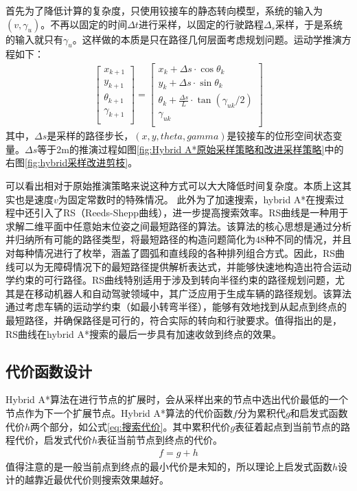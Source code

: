 \documentclass[master,academic]{ysuthesis} %
\begin{document}
		首先为了降低计算的复杂度，只使用铰接车的静态转向模型，系统的输入为$(v,\gamma_u)$。不再以固定的时间$\Delta t$进行采样，以固定的行驶路程$\Delta_s$采样，于是系统的输入就只有$\gamma_u$。这样做的本质是只在路径几何层面考虑规划问题。运动学推演方程如下：
		\begin{equation}
			\begin{aligned}
				\left[ \begin{array}{c}
					x_{k+1}\\
					y_{k+1}\\
					\theta _{k+1}\\
					\gamma _{k+1}\\
				\end{array} \right] =\left[ \begin{array}{c}
					x_k+\Delta s\cdot \cos\theta _k\\
					y_k+\Delta s\cdot \sin\theta _k\\
					\theta _k+\frac{\Delta s}{L}\cdot \tan (\gamma _{uk}/2 )\\
					\gamma _{uk}\\
				\end{array} \right] 
			\end{aligned}
			\label{eq:改进运动学推演策略}
		\end{equation}
		其中，$\Delta s$是采样的路径步长，$(x,y,theta,gamma)$是铰接车的位形空间状态变量。$\Delta s$等于2m的推演过程如图\ref{fig:Hybrid A*原始采样策略和改进采样策略}中的右图\ref{fig:hybrid采样改进剪枝}。

		可以看出相对于原始推演策略来说这种方式可以大大降低时间复杂度。本质上这其实也是速度$v$为固定常数时的特殊情况。
		此外为了加速搜索，hybrid A*在搜索过程中还引入了RS（Reeds-Shepp曲线），进一步提高搜索效率。RS曲线是一种用于求解二维平面中任意始末位姿之间最短路径的算法。该算法的核心思想是通过分析并归纳所有可能的路径类型，将最短路径的构造问题简化为48种不同的情况，并且对每种情况进行了枚举，涵盖了圆弧和直线段的各种排列组合方式。因此，RS曲线可以为无障碍情况下的最短路径提供解析表达式，并能够快速地构造出符合运动学约束的可行路径。RS曲线特别适用于涉及到转向半径约束的路径规划问题，尤其是在移动机器人和自动驾驶领域中，其广泛应用于生成车辆的路径规划。该算法通过考虑车辆的运动学约束（如最小转弯半径），能够有效地找到从起点到终点的最短路径，并确保路径是可行的，符合实际的转向和行驶要求。值得指出的是，RS曲线在hybrid A*搜索的最后一步具有加速收敛到终点的效果。

		\subsection{代价函数设计}
		Hybrid A*算法在进行节点的扩展时，会从采样出来的节点中选出代价最低的一个节点作为下一个扩展节点。Hybrid A*算法的代价函数$f$分为累积代$g$和启发式函数代价$h$两个部分，如公式\ref{eq:搜索代价}。其中累积代价$g$表征着起点到当前节点的路程代价，启发式代价$h$表征当前节点到终点的代价。
		\begin{equation}
			\begin{aligned}
				f = g+h
			\end{aligned}
			\label{eq:搜索代价}
		\end{equation}
		值得注意的是一般当前点到终点的最小代价是未知的，所以理论上启发式函数$h$设计的越靠近最优代价则搜索效果越好。
		
\end{document}
